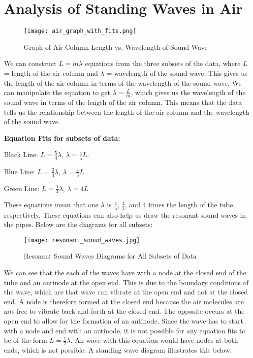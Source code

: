 \documentclass[11pt,twoside]{article}
\begin{document}

\section{Analysis of Standing Waves in Air}

\begin{figure}[H]
    \centering
    \texttt{[image: air\_graph\_with\_fits.png]}
    \caption{Graph of Air Column Length vs. Wavelength of Sound Wave}
\end{figure}

 We can construct $L = m\lambda$ equations from the three subsets of the data, where $L$ = length of the air column and $\lambda$ = wavelength of the sound wave. This gives us the length of the air column in terms of the wavelength of the sound wave. We can manipulate the equation to get $\lambda = \frac{L}{m}$, which gives us the wavelength of the sound wave in terms of the length of the air column. This means that the data tells us the relationship between the length of the air column and the wavelength of the sound wave.
 
\textbf{Equation Fits for subsets of data:}

Black Line: $L =\frac{5}{4}\lambda$, $\lambda = \frac{4}{5}L$. 

Blue Line: $L =\frac{3}{4}\lambda$, $\lambda = \frac{4}{3}L$

Green Line: $L = \frac{1}{4}\lambda$, $\lambda = 4L$

These equations mean that one $\lambda$ is $\frac{4}{5}$, $\frac{4}{3}$, and $4$ times the length of the tube, respectively. These equations can also help us draw the resonant sound waves in the pipes. Below are the diagrams for all subsets:

\begin{figure}[H]
    \centering
    \texttt{[image: resonant\_sonud\_waves.jpg]}
    \caption{Resonant Sound Waves Diagrams for All Subsets of Data}
\end{figure}

We can see that the each of the waves have with a node at the closed end of the tube and an antinode at the open end. This is due to the boundary conditions of the wave, which are that wave can vibrate at the open end and not at the closed end. A node is therefore formed at the closed end because the air molecules are not free to vibrate back and forth at the closed end. The opposite occurs at the open end to allow for the formation of an antinode. Since the wave has to start with a node and end with an antinode, it is not possible for any equation fits to be of the form $L = \frac{1}{2}\lambda$. An wave with this equation would have nodes at both ends, which is not possible. A standing wave diagram illustrates this below:
\end{document}
